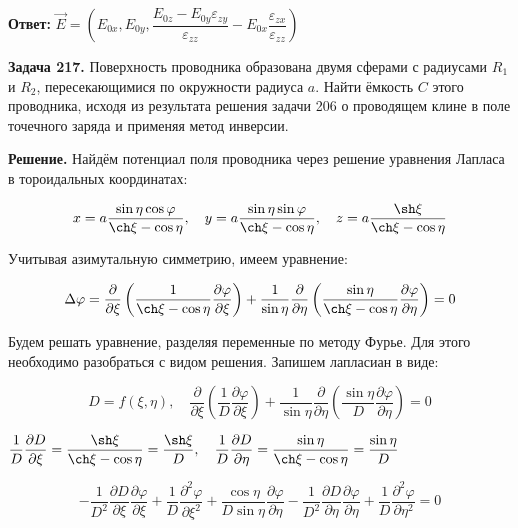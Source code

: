 \documentclass[a4paper,12pt]{article}
\begin{document}
	\quad \textbf{Ответ:} $\vec{E} = \left(E_{0x}, E_{0y}, \dfrac{E_{0z}-E_{0y}\varepsilon_{zy}}{\varepsilon_{zz}} - E_{0x} \dfrac{\varepsilon_{zx}}{\varepsilon_{zz}}\right)$
	
	
	\quad \textbf{Задача 217.} Поверхность проводника образована двумя сферами с радиусами $R_1$ и $R_2$, пересекающимися по окружности радиуса $a$. Найти ёмкость $C$ этого проводника, исходя из результата решения задачи 206 о проводящем клине в поле точечного заряда и применяя метод инверсии. 
	
	\quad \textbf{Решение.} Найдём потенциал поля проводника через решение уравнения Лапласа в тороидальных координатах:
	
	\begin{equation}
		x=a\dfrac{\sin \eta \cos\varphi}{\ch\xi - \cos\eta}, \quad y = a\dfrac{\sin\eta\sin\varphi}{\ch\xi - \cos\eta }, \quad  z = a\dfrac{\sh \xi}{\ch\xi - \cos\eta}
	\end{equation}
	
	\quad Учитывая азимутальную симметрию, имеем уравнение:
	
	\begin{equation}
		\Delta \varphi = \dfrac{\partial }{\partial \xi} \left(\dfrac{1}{\ch\xi - \cos\eta} \dfrac{\partial\varphi}{\partial\xi}\right) + \dfrac{1}{\sin\eta}\dfrac{\partial}{\partial\eta} \left(\dfrac{\sin\eta}{\ch\xi - \cos\eta}\dfrac{\partial \varphi}{\partial \eta}\right) = 0
	\end{equation}
	
	\quad Будем решать уравнение, разделяя переменные по методу Фурье. Для этого необходимо разобраться с видом решения. Запишем лапласиан в виде:
	
	\begin{equation}
		D = f(\xi, \eta), \quad \dfrac{\partial}{\partial\xi} \left(\dfrac{1}{D}\dfrac{\partial \varphi}{\partial \xi}\right) + \dfrac{1}{\sin\eta}\dfrac{\partial}{\partial\eta} \left(\dfrac{\sin\eta}{D} \dfrac{\partial\varphi}{\partial \eta}\right) = 0
	\end{equation}
	
	\begin{center}
		$\dfrac{1}{D}\dfrac{\partial D}{\partial \xi } = \dfrac{\sh\xi}{\ch\xi - \cos\eta} = \dfrac{\sh\xi}{D}, \quad \dfrac{1}{D}\dfrac{\partial D}{\partial \eta} = \dfrac{\sin\eta}{\ch\xi - \cos\eta} = \dfrac{\sin\eta}{D}$
	\end{center}
	
	\begin{equation}
		-\dfrac{1}{D^2}\dfrac{\partial D}{\partial \xi} \dfrac{\partial\varphi}{\partial\xi} + \dfrac{1}{D}\dfrac{\partial^2 \varphi}{\partial\xi^2} + \dfrac{\cos\eta}{D\sin\eta} \dfrac{\partial \varphi}{\partial \eta} - \dfrac{1}{D^2} \dfrac{\partial D}{\partial \eta} \dfrac{\partial\varphi}{\partial \eta} + \dfrac{1}{D}\dfrac{\partial^2 \varphi}{\partial\eta^2} = 0
	\end{equation}
	
\end{document}
